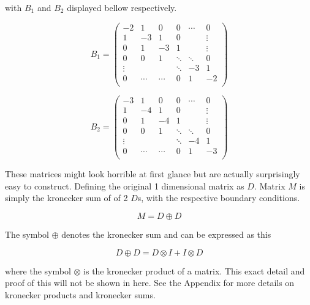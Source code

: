 with $B_1$ and $B_2$ displayed bellow respectively.

\begin{equation}
B_1 =
\begin{pmatrix}
    -2    &     1&     0&     0&\cdots&      0\\
    1     &    -3&     1&     0&      & \vdots\\
    0     &     1&    -3&     1&      & \vdots\\
    0     &     0&     1&\ddots&\ddots&      0\\
    \vdots&      &      &\ddots&    -3&      1\\
    0     &\cdots&\cdots&     0&     1&     -2\\
\end{pmatrix}
\end{equation}

\begin{equation}
B_2 =
\begin{pmatrix}
    -3    &     1&     0&     0&\cdots&      0\\
    1     &    -4&     1&     0&      & \vdots\\
    0     &     1&    -4&     1&      & \vdots\\
    0     &     0&     1&\ddots&\ddots&      0\\
    \vdots&      &      &\ddots&    -4&      1\\
    0     &\cdots&\cdots&     0&     1&     -3\\
\end{pmatrix}
\end{equation}

These matrices might look horrible at first glance but are actually surprisingly easy to construct. Defining the original 1 dimensional matrix as $D$. Matrix $M$ is simply the kronecker sum of of 2 $D$s, with the respective boundary conditions.

\begin{equation}
    M = D \oplus D
\end{equation}

The symbol $\oplus$ denotes the kronecker sum and can be expressed as this

\begin{equation}
    D \oplus D = D \otimes I + I \otimes D
\end{equation}

where the symbol $\otimes$ is the kronecker product of a matrix. This exact detail and proof of this will not be shown in here. See the Appendix for more details on kronecker products and kronecker sums.